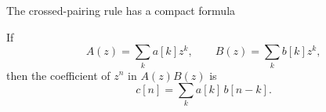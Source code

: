 \documentclass[aspectratio=169,11pt]{beamer}
\newcommand{\CardTitleSize}{\large}
\newcommand{\CardTitle}[1]{%
  \vspace{0.15cm}
  {\CardTitleSize\bfseries #1}\par
}
\begin{document}
\begin{frame}{The crossed-pairing rule has a compact formula}

\begin{BlueBox}[
  calloutshadedblue,
  fontupper=\large,
  halign=center
]{}
If
\[
A(z)=\sum_k a[k]z^k,
\qquad
B(z)=\sum_k b[k]z^k,
\]
then the coefficient of \(z^n\) in \(A(z)B(z)\) is
\[
c[n]=\sum_k a[k]\,b[n-k].
\]
\end{BlueBox}







\end{frame}
\end{document}
